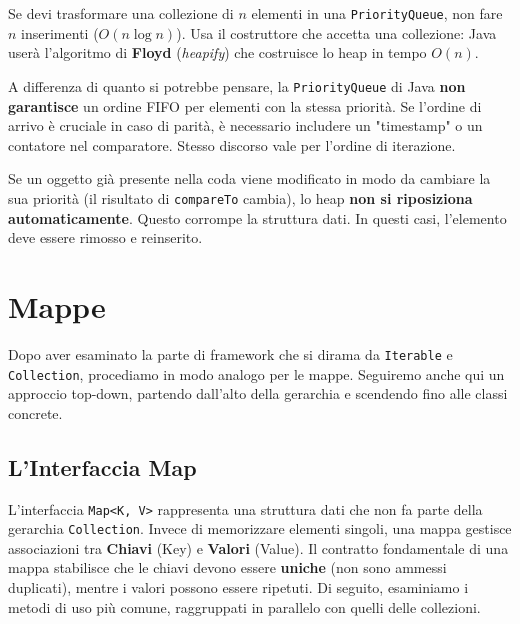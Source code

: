 \begin{bestpractice}
Se devi trasformare una collezione di $n$ elementi in una \texttt{PriorityQueue}, non fare $n$ inserimenti ($O(n \log n)$). Usa il costruttore che accetta una collezione: Java userà l'algoritmo di \textbf{Floyd} (\textit{heapify}) che costruisce lo heap in tempo \textbf{$O(n)$}.
\end{bestpractice}

\begin{warningbox}
        A differenza di quanto si potrebbe pensare, la \texttt{PriorityQueue} di Java \textbf{non garantisce} un ordine FIFO per elementi con la stessa priorità. Se l'ordine di arrivo è cruciale in caso di parità, è necessario includere un "timestamp" o un contatore nel comparatore. Stesso discorso vale per l'ordine di iterazione. 
\end{warningbox}

\begin{warningbox}
Se un oggetto già presente nella coda viene modificato in modo da cambiare la sua priorità (il risultato di \texttt{compareTo} cambia), lo heap \textbf{non si riposiziona automaticamente}. Questo corrompe la struttura dati. In questi casi, l'elemento deve essere rimosso e reinserito.
\end{warningbox}

\section{Mappe}
Dopo aver esaminato la parte di framework che si dirama da \texttt{Iterable} e \texttt{Collection}, procediamo in modo analogo per le mappe. Seguiremo anche qui un approccio top-down, partendo dall'alto della gerarchia e scendendo fino alle classi concrete. 

\subsection{L'Interfaccia Map}

L'interfaccia \texttt{Map<K, V>} rappresenta una struttura dati che non fa parte della gerarchia \texttt{Collection}. Invece di memorizzare elementi singoli, una mappa gestisce associazioni tra \textbf{Chiavi} (Key) e \textbf{Valori} (Value). Il contratto fondamentale di una mappa stabilisce che le chiavi devono essere \textbf{uniche} (non sono ammessi duplicati), mentre i valori possono essere ripetuti. Di seguito, esaminiamo i metodi di uso più comune, raggruppati in parallelo con quelli delle collezioni.

